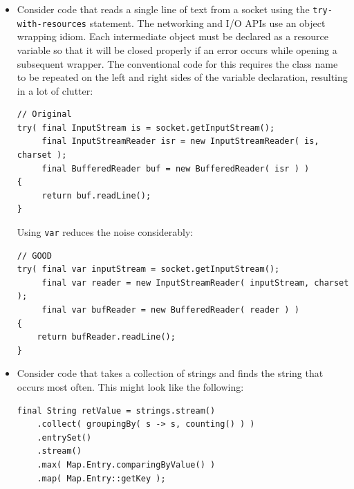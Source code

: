 \begin{itemize}
\item{Consider code that reads a single line of text from a socket using the \lstinline|try-with-resources| statement. The networking and I/O APIs use an object wrapping idiom. Each intermediate object must be declared as a resource variable so that it will be closed properly if an error occurs while opening a subsequent wrapper. The conventional code for this requires the class name to be repeated on the left and right sides of the variable declaration, resulting in a lot of clutter:
\begin{lstlisting}
// Original
try( final InputStream is = socket.getInputStream();
     final InputStreamReader isr = new InputStreamReader( is, charset );
     final BufferedReader buf = new BufferedReader( isr ) ) 
{
     return buf.readLine();
}
\end{lstlisting}

Using \lstinline|var| reduces the noise considerably:
\begin{lstlisting}
// GOOD
try( final var inputStream = socket.getInputStream();
     final var reader = new InputStreamReader( inputStream, charset );
     final var bufReader = new BufferedReader( reader ) ) 
{
    return bufReader.readLine();
}
\end{lstlisting}}

\item{Consider code that takes a collection of strings and finds the string that occurs most often. This might look like the following:
\begin{lstlisting}
final String retValue = strings.stream()
    .collect( groupingBy( s -> s, counting() ) )
    .entrySet()
    .stream()
    .max( Map.Entry.comparingByValue() )
    .map( Map.Entry::getKey );
\end{lstlisting}

}
\end{itemize}
